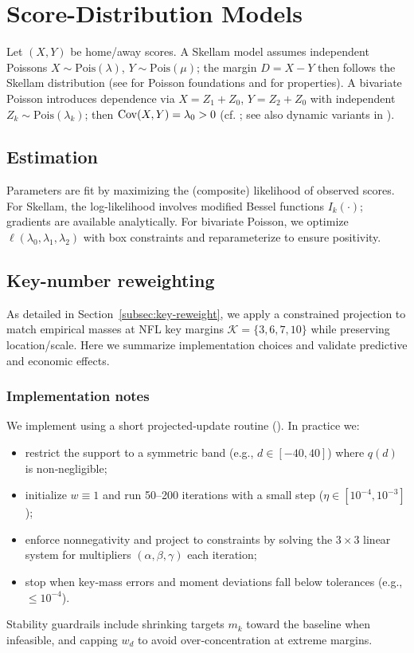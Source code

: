 \section{Score-Distribution Models}
Let $(X,Y)$ be home/away scores. A Skellam model assumes independent Poissons $X\sim\mathrm{Pois}(\lambda)$, $Y\sim\mathrm{Pois}(\mu)$; the margin $D=X-Y$ then follows the Skellam distribution (see  for Poisson foundations and  for properties). A bivariate Poisson introduces dependence via $X=Z_1+Z_0$, $Y=Z_2+Z_0$ with independent $Z_k\sim\mathrm{Pois}(\lambda_k)$; then $\mathrm{Cov}(X,Y)=\lambda_0>0$ (cf. ; see also dynamic variants in ).

\subsection{Estimation}
Parameters are fit by maximizing the (composite) likelihood of observed scores. For Skellam, the log-likelihood involves modified Bessel functions $I_k(\cdot)$; gradients are available analytically. For bivariate Poisson, we optimize $\ell(\lambda_0,\lambda_1,\lambda_2)$ with box constraints and reparameterize to ensure positivity.

\subsection{Key-number reweighting}
As detailed in Section~\ref{subsec:key-reweight}, we apply a constrained projection to match empirical masses at NFL key margins $\mathcal{K}=\{3,6,7,10\}$ while preserving location/scale. Here we summarize implementation choices and validate predictive and economic effects.

\subsubsection*{Implementation notes}
We implement  using a short projected‑update routine (). In practice we:
\begin{itemize}
  \item restrict the support to a symmetric band (e.g., $d\in[-40,40]$) where $q(d)$ is non‑negligible;
  \item initialize $w\equiv 1$ and run 50–200 iterations with a small step (\(\eta\in[10^{-4},10^{-3}]\));
  \item enforce nonnegativity and project to constraints by solving the $3\times 3$ linear system for multipliers $(\alpha,\beta,\gamma)$ each iteration;
  \item stop when key‑mass errors and moment deviations fall below tolerances (e.g., $\le 10^{-4}$).
\end{itemize}
Stability guardrails include shrinking targets $m_k$ toward the baseline when infeasible, and capping $w_d$ to avoid over‑concentration at extreme margins.

